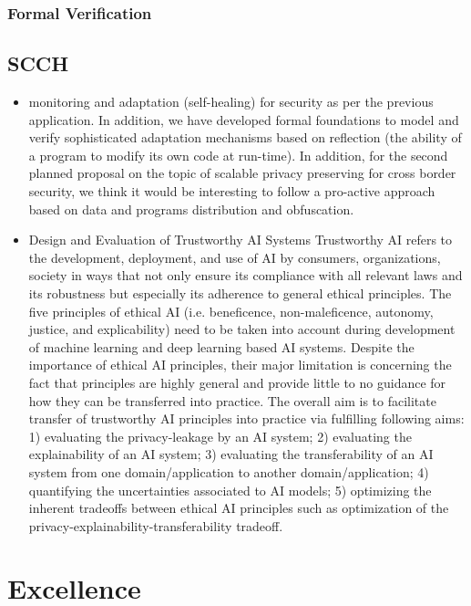 \documentclass[a4paper,11pt]{article}
\begin{document}
\subsubsection{Formal Verification}

\subsection{SCCH}
\begin{itemize}
\item monitoring and adaptation (self-healing) for security as per the previous application. In addition, we have developed formal foundations to model and verify sophisticated adaptation mechanisms based on reflection (the ability of a program to modify its own code at run-time). In addition, for the second planned proposal on the topic of scalable privacy preserving for cross border security, we think it would be interesting to follow a pro-active approach based on data and programs distribution and obfuscation.
\item Design and Evaluation of Trustworthy AI Systems
Trustworthy AI refers to the development, deployment, and use of AI by consumers, organizations, society in ways that not only ensure its compliance with all relevant laws and its robustness but especially its adherence to general ethical principles. The five principles of ethical AI (i.e. beneficence, non-maleficence, autonomy, justice, and explicability) need to be taken into account during development of machine learning and deep learning based AI systems. Despite the importance of ethical AI principles, their major limitation is concerning the fact that principles are highly general and provide little to no guidance for how they can be transferred into practice. The overall aim is to facilitate transfer of trustworthy AI principles into practice via fulfilling following aims: 
1) evaluating the privacy-leakage by an AI system; 
2) evaluating the explainability of an AI system; 
3) evaluating the transferability of an AI system from one domain/application to another domain/application; 
4) quantifying the uncertainties associated to AI models; 
5) optimizing the inherent tradeoffs between ethical AI principles such as optimization of the privacy-explainability-transferability tradeoff.
\end{itemize}




\section{Excellence}
\end{document}
